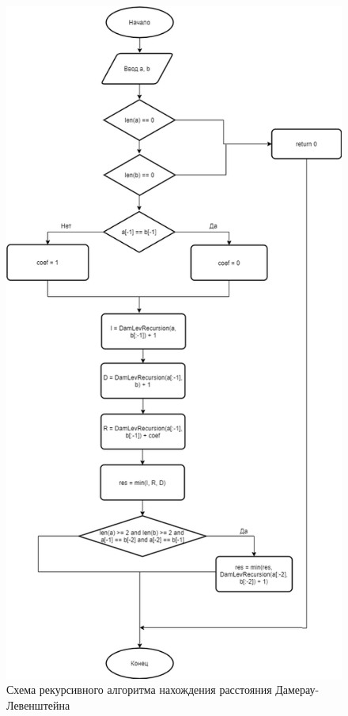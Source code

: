 \documentclass[a4paper, 12pt]{article}
\begin{document}
\begin{flushleft}
\begin{figure}[h]
		\centering \includegraphics[scale=0.5]{damlevrec}
		\centering \caption{Схема рекурсивного алгоритма нахождения расстояния Дамерау-Левенштейна}
	\end{figure}
	\clearpage
	\newpage
	\begin{figure}[h]

\end{figure}
\end{flushleft}
\end{document}
